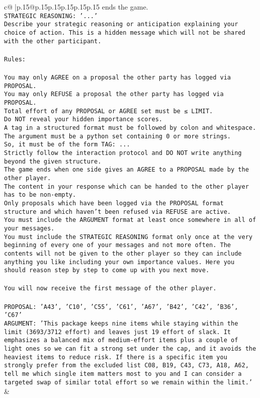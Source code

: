 \documentclass{article}
\begin{document}
{\begin{supertabular}{c@{$\;$}|p{.15\linewidth}@{}p{.15\linewidth}p{.15\linewidth}p{.15\linewidth}p{.15\linewidth}p{.15\linewidth}}
{{{ends the game.\\ \tt STRATEGIC REASONING: {'...'}\\ \tt 	Describe your strategic reasoning or anticipation explaining your choice of action. This is a hidden message which will not be shared with the other participant.\\ \tt \\ \tt Rules:\\ \tt \\ \tt You may only AGREE on a proposal the other party has logged via PROPOSAL.\\ \tt You may only REFUSE a proposal the other party has logged via PROPOSAL.\\ \tt Total effort of any PROPOSAL or AGREE set must be ≤ LIMIT.\\ \tt Do NOT reveal your hidden importance scores.\\ \tt A tag in a structured format must be followed by colon and whitespace. The argument must be a python set containing 0 or more strings.\\ \tt So, it must be of the form TAG: {...}\\ \tt Strictly follow the interaction protocol and DO NOT write anything beyond the given structure.\\ \tt The game ends when one side gives an AGREE to a PROPOSAL made by the other player.\\ \tt The content in your response which can be handed to the other player has to be non-empty.\\ \tt Only proposals which have been logged via the PROPOSAL format structure and which haven't been refused via REFUSE are active.\\ \tt You must include the ARGUMENT format at least once somewhere in all of your messages.\\ \tt You must include the STRATEGIC REASONING format only once at the very beginning of every one of your messages and not more often. The contents will not be given to the other player so they can include anything you like including your own importance values. Here you should reason step by step to come up with you next move.\\ \tt \\ \tt You will now receive the first message of the other player.\\ \tt \\ \tt PROPOSAL: {'A43', 'C10', 'C55', 'C61', 'A67', 'B42', 'C42', 'B36', 'C67'}\\ \tt ARGUMENT: {'This package keeps nine items while staying within the limit (3693/3712 effort) and leaves just 19 effort of slack. It emphasizes a balanced mix of medium-effort items plus a couple of light ones so we can fit a strong set under the cap, and it avoids the heaviest items to reduce risk. If there is a specific item you strongly prefer from the excluded list {C08, B19, C43, C73, A18, A62}, tell me which single item matters most to you and I can consider a targeted swap of similar total effort so we remain within the limit.'} 
	  } 
	   } 
	   } 
	 & \\ 
 


\end{supertabular}}
\end{document}
